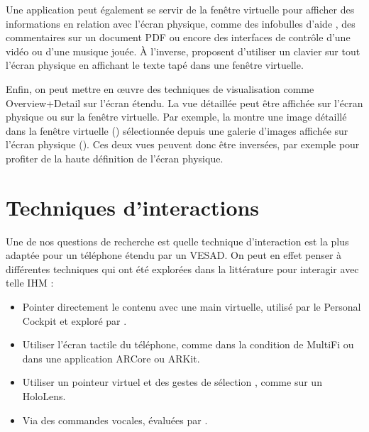 Une application peut également se servir de la fenêtre virtuelle pour afficher des informations en relation avec l'écran physique, comme des infobulles d'aide , des commentaires sur un document PDF ou encore des interfaces de contrôle d'une vidéo ou d'une musique jouée. À l'inverse, \cite{Grubert2015} proposent d'utiliser un clavier sur tout l'écran physique en affichant le texte tapé dans une fenêtre virtuelle.

Enfin, on peut mettre en \oe uvre des techniques de visualisation comme Overview+Detail sur l'écran étendu. La vue détaillée peut être affichée sur l'écran physique ou sur la fenêtre virtuelle. Par exemple, la  montre une image détaillé dans la fenêtre virtuelle () sélectionnée depuis une galerie d'images affichée sur l'écran physique (). Ces deux vues peuvent donc être inversées, par exemple pour profiter de la haute définition de l'écran physique.



\section{Techniques d'interactions}
\label{sec:concept_interaction_techniques}

Une de nos questions de recherche  est quelle technique d'interaction est la plus adaptée pour un téléphone étendu par un VESAD. On peut en effet penser à différentes techniques qui ont été explorées dans la littérature pour interagir avec telle IHM :

\begin{itemize}
  \item Pointer directement le contenu avec une main virtuelle, utilisé par le Personal Cockpit \citep{Ens2014} et exploré par \cite{Piumsomboon2013}.
  \item Utiliser l'écran tactile du téléphone, comme dans la condition  de MultiFi \citep{Grubert2015} ou dans une application ARCore ou ARKit.
  \item Utiliser un pointeur virtuel et des gestes de sélection \citep{Wilson2006}, comme sur un HoloLens.
  \item Via des commandes vocales, évaluées par \cite{Piumsomboon2014}.
\end{itemize}
\medskip

